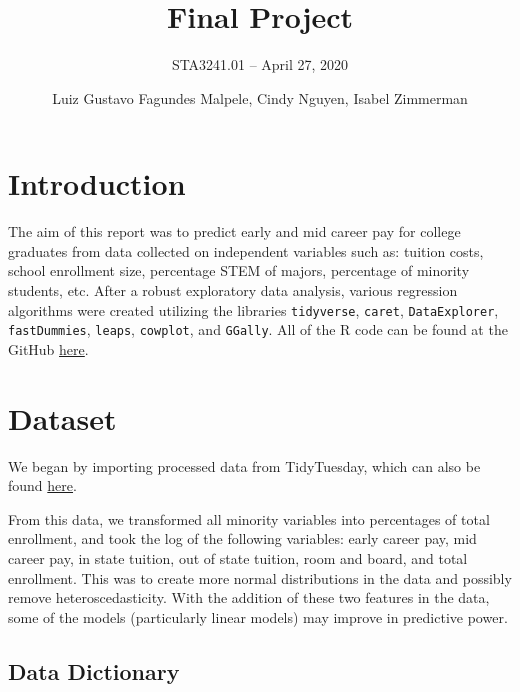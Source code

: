 \documentclass[
]{article}
\title{Final Project}
\subtitle{STA3241.01 -- April 27, 2020}
\author{Luiz Gustavo Fagundes Malpele, Cindy Nguyen, Isabel Zimmerman}
\date{}
\begin{document}
\maketitle

{
\setcounter{tocdepth}{2}
\tableofcontents
}
\hypertarget{introduction}{%
\section{Introduction}\label{introduction}}

The aim of this report was to predict early and mid career pay for
college graduates from data collected on independent variables such as:
tuition costs, school enrollment size, percentage STEM of majors,
percentage of minority students, etc. After a robust exploratory data
analysis, various regression algorithms were created utilizing the
libraries \texttt{tidyverse}, \texttt{caret}, \texttt{DataExplorer},
\texttt{fastDummies}, \texttt{leaps}, \texttt{cowplot}, and
\texttt{GGally}. All of the R code can be found at the GitHub
\href{https://github.com/luizmalpele/stats_learning_project/}{here}.

\hypertarget{dataset}{%
\section{Dataset}\label{dataset}}

We began by importing processed data from TidyTuesday, which can also be
found
\href{https://github.com/luizmalpele/stats_learning_project/blob/master/data/data.Rmd}{here}.

From this data, we transformed all minority variables into percentages
of total enrollment, and took the log of the following variables: early
career pay, mid career pay, in state tuition, out of state tuition, room
and board, and total enrollment. This was to create more normal
distributions in the data and possibly remove heteroscedasticity. With
the addition of these two features in the data, some of the models
(particularly linear models) may improve in predictive power.

\hypertarget{data-dictionary}{%
\subsection{Data Dictionary}\label{data-dictionary}}
\end{document}
